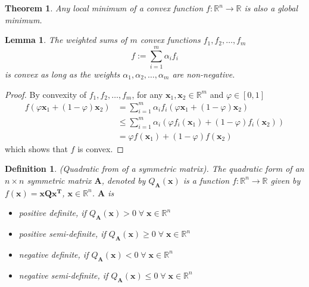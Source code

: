 \documentclass[12pt]{report}
\newtheorem{defn}{Definition}[section]
\newtheorem{thm}{Theorem}[section]
\newtheorem{lemma}{Lemma}[section]
\numberwithin{equation}{section}
\begin{document}
\begin{thm}\label{thm:local_is_global}
\normalfont
Any local minimum of a convex function $f:\mathbb{R}^n\rightarrow\mathbb{R}$ is also a global minimum.
\end{thm}
\begin{lemma}\label{lemma:sum}
\normalfont
The weighted sums of $m$ convex functions $f_1,f_2,\hdots,f_m$
\[ f := \sum_{i=1}^m \alpha_i f_i \]
is convex as long as the weights $\alpha_1,\alpha_2,\hdots,\alpha_m$ are non-negative. 
\end{lemma}
\begin{proof}
By convexity of $f_1,f_2,\hdots,f_m$, for any $\bm{x}_1,\bm{x}_2 \in \mathbb{R}^m$ and $\varphi \in [0,1]$
\[
\begin{aligned} 
f(\varphi \bm{x}_1+(1-\varphi) \bm{x}_2) &=\sum_{i=1}^{m} \alpha_{i} f_{i}(\varphi \bm{x}_1+(1-\varphi) \bm{x}_2) \\ 
	& \leq \sum_{i=1}^{m} \alpha_{i}\left(\varphi f_{i}(\bm{x}_1)+(1-\varphi) f_{i}(\bm{x}_2)\right) \\ 
	&=\varphi f(\bm{x}_1)+(1-\varphi) f(\bm{x}_2) 
\end{aligned}
\]
which shows that $f$ is convex.
\end{proof}
\begin{defn}
\normalfont (Quadratic from of a symmetric matrix).
The quadratic form of an $n\times n$ symmetric matrix $\bm{A}$, denoted by $Q_{\bm{A}}(\bm{x})$ is a function $f:\mathbb{R}^n\rightarrow \mathbb{R}$ given by $f(\bm{x})=\bm{xQx^T}$, $\bm{x}\in\mathbb{R}^n$. $\bm{A}$ is
\begin{itemize}
\item positive definite, if $Q_{\bm{A}}(\bm{x}) > 0 \; \forall \; \bm{x}\in\mathbb{R}^n$
\item positive semi-definite, if $Q_{\bm{A}}(\bm{x}) \geq 0 \; \forall \; \bm{x}\in\mathbb{R}^n$
\item negative definite, if $Q_{\bm{A}}(\bm{x}) < 0 \; \forall \; \bm{x}\in\mathbb{R}^n$
\item negative semi-definite, if $Q_{\bm{A}}(\bm{x}) \leq 0 \; \forall \; \bm{x}\in\mathbb{R}^n$
\end{itemize}
\end{defn}
\end{document}
